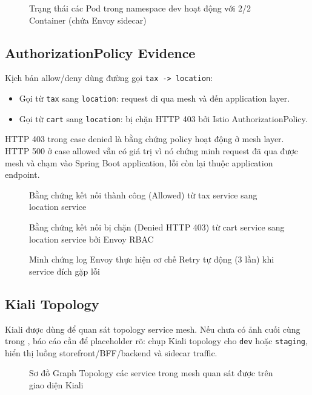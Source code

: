 \begin{figure}[H]
\centering
{}
\caption{Trạng thái các Pod trong namespace dev hoạt động với 2/2 Container (chứa Envoy sidecar)}
\end{figure}

\subsection{AuthorizationPolicy Evidence}

Kịch bản allow/deny dùng đường gọi \texttt{tax -> location}:

\begin{itemize}
    \item Gọi từ \texttt{tax} sang \texttt{location}: request đi qua mesh và đến application layer.
    \item Gọi từ \texttt{cart} sang \texttt{location}: bị chặn HTTP 403 bởi Istio AuthorizationPolicy.
\end{itemize}

HTTP 403 trong case denied là bằng chứng policy hoạt động ở mesh layer. HTTP 500 ở
case allowed vẫn có giá trị vì nó chứng minh request đã qua được mesh và chạm vào
Spring Boot application, lỗi còn lại thuộc application endpoint.

\begin{figure}[H]
\centering
{}
\caption{Bằng chứng kết nối thành công (Allowed) từ tax service sang location service}
\end{figure}

\begin{figure}[H]
\centering
{}
\caption{Bằng chứng kết nối bị chặn (Denied HTTP 403) từ cart service sang location service bởi Envoy RBAC}
\end{figure}

\begin{figure}[H]
\centering
{}
\caption{Minh chứng log Envoy thực hiện cơ chế Retry tự động (3 lần) khi service đích gặp lỗi}
\end{figure}

\subsection{Kiali Topology}

Kiali được dùng để quan sát topology service mesh. Nếu chưa có ảnh cuối cùng trong
, báo cáo cần để placeholder rõ: chụp Kiali topology
cho \texttt{dev} hoặc \texttt{staging}, hiển thị luồng storefront/BFF/backend và
sidecar traffic.

\begin{figure}[H]
\centering
{}
\caption{Sơ đồ Graph Topology các service trong mesh quan sát được trên giao diện Kiali}
\end{figure}
